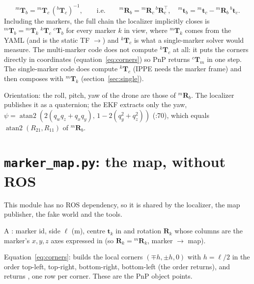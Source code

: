 \begin{equation}
{}^m\mathbf T_b = {}^m\mathbf T_c\,({}^b\mathbf T_c)^{-1},
\qquad\text{i.e.}\qquad
{}^m\mathbf R_b = {}^m\mathbf R_c\,{}^b\mathbf R_c^\top,\quad
{}^m\mathbf t_b = {}^m\mathbf t_c - {}^m\mathbf R_b\,{}^b\mathbf t_c .
\label{eq:body}
\end{equation}
Including the markers, the full chain the localizer implicitly closes is
${}^m\mathbf T_b = {}^m\mathbf T_{k}\;{}^{k}\mathbf T_c\;{}^c\mathbf T_b$ for every marker $k$ in view, where
${}^m\mathbf T_k$ comes from the YAML (and is the static TF $\to$) and ${}^k\mathbf T_c$ is
what a single-marker solver would measure. The multi-marker code does not compute ${}^k\mathbf T_c$ at all: it puts
the corners directly in  coordinates (equation~\eqref{eq:corners}) so PnP returns ${}^c\mathbf T_m$ in one
step. The single-marker code does compute ${}^k\mathbf T_c$ (IPPE needs the marker frame) and then composes with
${}^m\mathbf T_k$ (section~\ref{sec:single}).

Orientation: the roll, pitch, yaw of the drone are those of ${}^m\mathbf R_b$. The localizer publishes it as a
quaternion; the EKF extracts only the yaw, $\psi = \operatorname{atan2}(2(q_wq_z+q_xq_y),\,1-2(q_y^2+q_z^2))$
(:70), which equals $\operatorname{atan2}(R_{21},R_{11})$ of ${}^m\mathbf R_b$.



\section{\texttt{marker\_map.py}: the map, without ROS}

This module has no ROS dependency, so it is shared by the localizer, the map publisher, the fake world and the tools.

A : marker id, side $\ell$ (m), centre $\mathbf t_k$ in  and rotation $\mathbf R_k$ whose
columns are the marker's $x,y,z$ axes expressed in  (so $\mathbf R_k = {}^m\mathbf R_k$, marker
$\to$ map).

Equation~\eqref{eq:corners}: builds the local corners $(\mp h,\pm h,0)$ with $h=\ell/2$ in the order top-left,
top-right, bottom-right, bottom-left (the order  returns), and returns
, one row per corner. These are the PnP object points.


